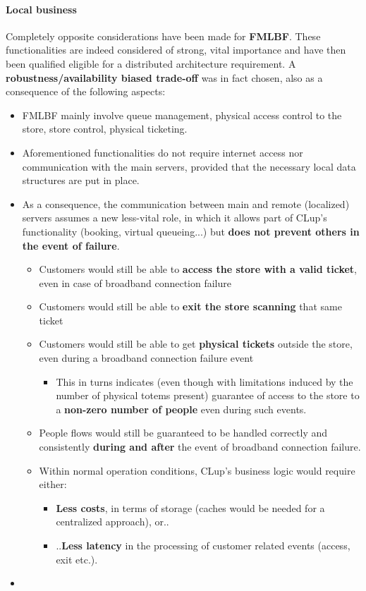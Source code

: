\paragraph{Local business}
Completely opposite considerations have been made for \textbf{FMLBF}. These functionalities are indeed considered of strong, vital importance and have then been qualified eligible for a distributed architecture requirement. A \textbf{robustness/availability biased trade-off} was in fact chosen, also as a consequence of the following aspects:\newline
\begin{itemize}
    \item FMLBF mainly involve queue management, physical access control to the store, store control, physical ticketing. 
    \item Aforementioned functionalities do not require internet access nor communication with the main servers, provided that the necessary local data structures are put in place.
    \item As a consequence, the communication between main and remote (localized) servers assumes a new less-vital role, in which it allows part of CLup's functionality (booking, virtual queueing...) but \textbf{does not prevent others in the event of failure}.
    \begin{itemize}
        \item Customers would still be able to \textbf{access the store with a valid ticket}, even in case of broadband connection failure
        \item Customers would still be able to \textbf{exit the store scanning} that same ticket
        \item Customers would still be able to get \textbf{physical tickets} outside the store, even during a broadband connection failure event
        \begin{itemize}
            \item This in turns indicates (even though with limitations induced by the number of physical totems present) guarantee of access to the store to a \textbf{non-zero number of people} even during such events.
        \end{itemize}
        \item People flows would still be guaranteed to be handled correctly and consistently \textbf{during and after} the event of broadband connection failure.
        \item Within normal operation conditions, CLup's business logic would require either:
        \begin{itemize}
            \item \textbf{Less costs}, in terms of storage (caches would be needed for a centralized approach), or..
            \item ..\textbf{Less latency} in the processing of customer related events (access, exit etc.).
        \end{itemize}
    \end{itemize}
    \item 

\end{itemize}

